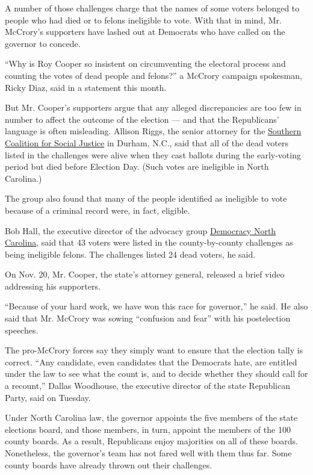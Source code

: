 A number of those challenges charge that the names of some voters
belonged to people who had died or to felons ineligible to vote. With
that in mind, Mr. McCrory's supporters have lashed out at Democrats who
have called on the governor to concede.

``Why is Roy Cooper so insistent on circumventing the electoral process
and counting the votes of dead people and felons?'' a McCrory campaign
spokesman, Ricky Diaz, said in a statement this month.

But Mr. Cooper's supporters argue that any alleged discrepancies are too
few in number to affect the outcome of the election --- and that the
Republicans' language is often misleading. Allison Riggs, the senior
attorney for the \href{https://www.southerncoalition.org/}{Southern
Coalition for Social Justice} in Durham, N.C., said that all of the dead
voters listed in the challenges were alive when they cast ballots during
the early-voting period but died before Election Day. (Such votes are
ineligible in North Carolina.)

The group also found that many of the people identified as ineligible to
vote because of a criminal record were, in fact, eligible.

Bob Hall, the executive director of the advocacy group
\href{http://nc-democracy.org/}{Democracy North Carolina}, said that 43
voters were listed in the county-by-county challenges as being
ineligible felons. The challenges listed 24 dead voters, he said.

On Nov. 20, Mr. Cooper, the state's attorney general, released a brief
video addressing his supporters.

``Because of your hard work, we have won this race for governor,'' he
said. He also said that Mr. McCrory was sowing ``confusion and fear''
with his postelection speeches.

The pro-McCrory forces say they simply want to ensure that the election
tally is correct. ``Any candidate, even candidates that the Democrats
hate, are entitled under the law to see what the count is, and to decide
whether they should call for a recount,'' Dallas Woodhouse, the
executive director of the state Republican Party, said on Tuesday.

Under North Carolina law, the governor appoints the five members of the
state elections board, and those members, in turn, appoint the members
of the 100 county boards. As a result, Republicans enjoy majorities on
all of these boards. Nonetheless, the governor's team has not fared well
with them thus far. Some county boards have already thrown out their
challenges.

